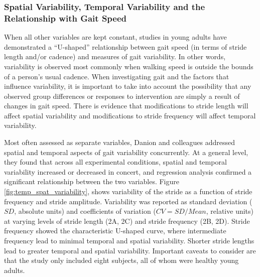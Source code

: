 \documentclass[11pt, oneside]{report}
\begin{document}
\subsubsection{Spatial Variability, Temporal Variability and the Relationship with Gait Speed}

When all other variables are kept constant, studies in young adults have demonstrated a ``U-shaped'' relationship between gait speed (in terms of stride length and/or cadence) and measures of gait variability\cite{Hausdorff2005}. In other words, variability is observed most commonly when walking speed is outside the bounds of a person's usual cadence. When investigating gait and the factors that influence variability, it is important to take into account the possibility that any observed group differences or responses to intervention are simply a result of changes in gait speed\cite{Hausdorff2005}. There is evidence that modifications to stride length will affect spatial variability\cite{Sekiya1997} and modifications to stride frequency will affect  temporal variability\cite{Maruyama1992}.

Most often assessed as separate variables, Danion and colleagues\cite{Danion2003} addressed spatial and temporal aspects of gait variability concurrently. At a general level, they found that across all experimental conditions, spatial and temporal variability increased or decreased in concert, and regression analysis confirmed a significant relationship between the two variables\cite{Danion2003}. Figure \ref{fig:temp_spat_variability}, shows variability of the stride as a function of stride frequency and stride amplitude. Variability was reported as standard deviation ($SD$, absolute units) and coefficients of variation ($CV = SD/Mean$, relative units) at varying levels of stride length (2A, 2C) and stride frequency (2B, 2D). Stride frequency showed the characteristic U-shaped curve, where intermediate frequency lead to minimal temporal and spatial variability. Shorter stride lengths lead to greater temporal and spatial variability\cite{Danion2003}. Important caveats to consider are that the study only included eight subjects, all of whom were healthy young adults.
\end{document}
